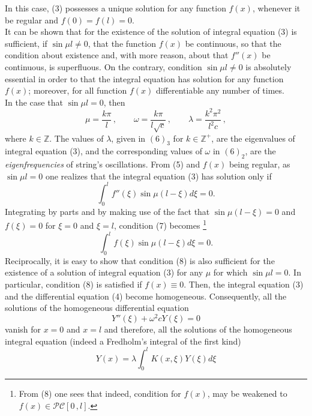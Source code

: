 \documentclass[12pt]{article}
\begin{document}
In this case, (3) possesses a unique solution for any function $f(x)$, whenever it be regular and $f(0)=f(l)=0$. \\
It can be shown that for the existence of the solution of integral equation (3) is sufficient, if $\sin\mu l\neq 0$, that the function $f(x)$ be continuous, so that the condition about existence and, with more reason, about that $f''(x)$ be continuous, is superfluous. On the contrary,  condition $\sin\mu l\neq 0$ is absolutely essential in order to that the integral equation has solution for any function $f(x)$; moreover, for all function $f(x)$ differentiable any number of times. \\
In the case that $\sin\mu l=0$, then
\begin{equation}
\mu=\frac{k\pi}{l}\,, \qquad \omega=\frac{k\pi}{l\sqrt{c}}\,, \qquad 
\lambda=\frac{k^2\pi^2}{l^2c}\,,
\end{equation}
where $k\in\mathbb{Z}$. The values of $\lambda$, given in $(6)_3$ for $k\in\mathbb{Z}^+$, are the eigenvalues of integral equation (3), and the corresponding values of $\omega$ in $(6)_2$, are the \emph{eigenfrequencies} of string's oscillations. From (5) and $f(x)$ being regular, as $\sin\mu l=0$ one realizes that the integral equation (3) has solution only if
\begin{equation}
\int_0^l f''(\xi)\sin\mu(l-\xi)d\xi=0.
\end{equation}
Integrating by parts and by making use of the fact that  $\sin\mu(l-\xi)=0$ and $f(\xi)=0$ for $\xi=0$ and $\xi=l$, condition (7) becomes {\footnote{From (8) one sees that indeed, condition for $f(x)$, may be weakened to $f(x)\in\mathcal{PC}[0\,,l]$.}} 
\begin{equation}
\int_0^l f(\xi)\sin\mu(l-\xi)d\xi=0.
\end{equation}  
Reciprocally, it is easy to show that condition (8) is also sufficient for the existence of a solution of integral equation (3) for any $\mu$ for which $\sin\mu l=0$. In particular, condition  (8) is satisfied if $f(x)\equiv 0$. Then, the integral equation (3) and the differential equation (4) become homogeneous. Consequently, all the solutions of  the homogeneous differential equation
\begin{equation*}
 Y''(\xi)+\omega^2cY(\xi)=0
\end{equation*}
vanish for $x=0$ and $x=l$ and therefore, all the solutions of the homogeneous integral equation (indeed a Fredholm's integral of the first kind)
\begin{equation*}
 Y(x)=\lambda\int_0^l K(x,\xi)Y(\xi)d\xi
\end{equation*}
\end{document}
